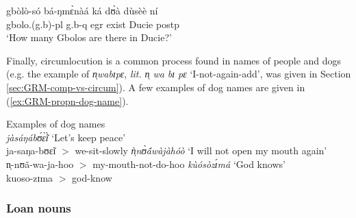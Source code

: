 \begin{exe}
\begin{exe}
\begin{exe}
{\begin{exe}
\begin{exe}
\begin{exe}
\begin{exe}
\begin{exe}
\begin{exe}
  \begin{exe}
   \ex\label{ex:GRM-propn-noun-plur}
\gll  gbòlò-só bá-ŋmɛ̀nàá ká dʊ̀à dùsèè ní\\
gbolo.({\sc g.}b)-{\sc pl}  {\sc g.}b-{\sc q} {\sc  egr} exist Ducie {\sc
postp}\\
\glt  `How many Gbolos are there in Ducie?' 
    \z

Finally, circumlocution is a common process found in names of people and dogs 
 (e.g. the example of {\it n̩wabɪpɛ}, 
{\it lit.}  {\it n̩ wa bɪ pɛ}  `I-not-again-add', was given in Section
\ref{sec:GRM-comp-vs-circum}).   A few examples of dog names are given in
(\ref{ex:GRM-propn-dog-name}).


  \ea\label{ex:GRM-propn-dog-name}{\rm Examples of dog names}\\
 

 \ea\label{ex:GRM-propn-dog-name-1} 
{\it jàsáŋábʊ́ɛ̃̀ɪ̀} `Let's keep peace'\\ 
ja-saŋa-bʊɛ̃ɪ   $>$  we-sit-slowly  
 \ex\label{ex:GRM-propn-dog-name-2} 
{\it ǹ̩nʊ̀ã́wàjàhóò}   `I will not open my mouth again'  \\ 
 n̩-nʊã-wa-ja-hoo  $>$ my-mouth-not-do-hoo 
 \ex\label{ex:GRM-propn-dog-name-3} 
{\it kùósòzɪ́má}   `God knows' \\  
kuoso-zɪma $>$ god-know

\z 
 \z






\subsubsection{Loan nouns}
\label{sec:GRM-borr-noun}



\end{exe}
\end{exe}
\end{exe}
\end{exe}
\end{exe}
\end{exe}
\end{exe}}
\end{exe}
\end{exe}
\end{exe}
